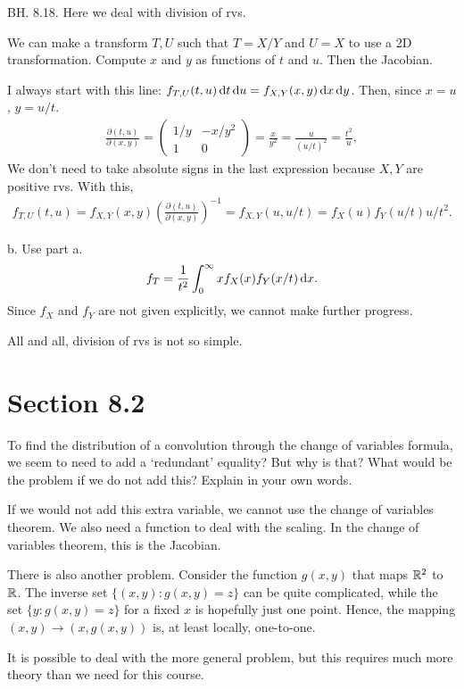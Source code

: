 \begin{exercise}
BH. 8.18. Here we deal with division of rvs.
\begin{hint} We can make a transform $T, U$ such that $T=X/Y$ and $U=X$  to use a 2D transformation. Compute $x$ and $y$ as functions of $t$ and $u$. Then the Jacobian.
\end{hint}
\begin{solution}
I always start with this line: $f_{T,U}(t,u) \,\textrm{d}t \,\textrm{d}u = f_{X,Y}(x,y) \,\textrm{d}x \,\textrm{d}y$.
Then, since $x=u$, $y=u/t$.
\begin{align*}
\frac{\partial (t, u)}{\partial (x,y)} =
  \begin{pmatrix}
1/y & -x/y^{2} \\
    1 & 0
  \end{pmatrix} = \frac{x}{y^{2}} = \frac{u}{(u/t)^{2}} = \frac{t^{2}}{u},
\end{align*}
We don't need to take absolute signs in the last expression because $X, Y$ are positive rvs.
With this,
\begin{align*}
  f_{T,U}(t,u) = f_{X,Y}(x,y) \left(\frac{\partial (t, u)}{\partial (x,y)}\right)^{-1} = f_{X,Y}(u,u/t) = f_X(u)f_Y(u/t) u/t^{2}.
\end{align*}

b. Use part a.
\begin{align*}
f_{T} = \frac 1{t^2} \int_0^{\infty} x f_X(x) f_Y(x/t) \,\textrm{d}x.
\end{align*}
Since $f_X$ and $f_Y$ are not given explicitly, we cannot make further progress.

All and all, division of rvs is not so simple.
\end{solution}
\end{exercise}


\section{Section 8.2}
\label{sec:section-8.2}


\begin{exercise}
To find the distribution of a convolution through the change of variables formula, we seem to need to add a `redundant' equality?
But why is that?
What would be the problem if we do not add this?
Explain in your own words.
\begin{solution}
If we would not add this extra variable, we cannot use the change of variables theorem. We also need a function to deal with the scaling. In the change of variables theorem, this is the Jacobian.

There is also another problem.
Consider the function $g(x, y)$ that maps $\mathbb{R}^{2}$ to $\mathbb{R}$.
The inverse set $\{ (x,y) : g(x,y) =z \}$ can be quite complicated, while the set $\{y : g(x, y) = z\}$ for a fixed $x$ is hopefully just one point.
Hence, the mapping $(x, y) \to (x, g(x,y))$ is, at least locally, one-to-one.

It is possible to deal with the more general problem, but this requires much more theory than we need for this course.
\end{solution}
\end{exercise}


